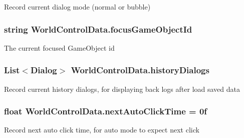 Record current dialog mode (normal or bubble) 

\subsubsection[{\texorpdfstring{focus\+Game\+Object\+Id}{focusGameObjectId}}]{\setlength{\rightskip}{0pt plus 5cm}string World\+Control\+Data.\+focus\+Game\+Object\+Id}\hypertarget{class_world_control_data_a1016da14145c3cf49853b0dd1f0cadfd}{}\label{class_world_control_data_a1016da14145c3cf49853b0dd1f0cadfd}


The current focused Game\+Object id 

\subsubsection[{\texorpdfstring{history\+Dialogs}{historyDialogs}}]{\setlength{\rightskip}{0pt plus 5cm}List$<${\bf Dialog}$>$ World\+Control\+Data.\+history\+Dialogs}\hypertarget{class_world_control_data_a929b204522d67946285280d97798fee1}{}\label{class_world_control_data_a929b204522d67946285280d97798fee1}


Record current history dialogs, for displaying back logs after load saved data 

\subsubsection[{\texorpdfstring{next\+Auto\+Click\+Time}{nextAutoClickTime}}]{\setlength{\rightskip}{0pt plus 5cm}float World\+Control\+Data.\+next\+Auto\+Click\+Time = 0f}\hypertarget{class_world_control_data_a7a50bd56671a90d950c4c74ea322adca}{}\label{class_world_control_data_a7a50bd56671a90d950c4c74ea322adca}


Record next auto click time, for auto mode to expect next click 

